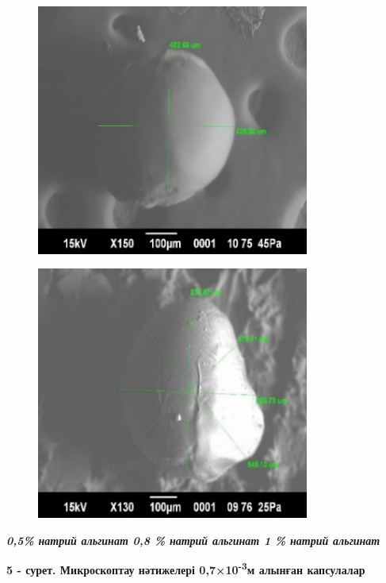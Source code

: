 \begin{figure}[H]
	\centering
	\includegraphics[width=0.8\textwidth]{media/pish/image27}
	\caption*{}
\end{figure}


\begin{figure}[H]
	\centering
	\includegraphics[width=0.8\textwidth]{media/pish/image28}
	\caption*{}
\end{figure}


\emph{{\bfseries 0,5\% натрий альгинат 0,8 \% натрий альгинат 1 \% натрий
альгинат}}

{\bfseries 5 - сурет. Микроскоптау нәтижелері 0,7×10\textsuperscript{-3}м
алынған капсулалар}



